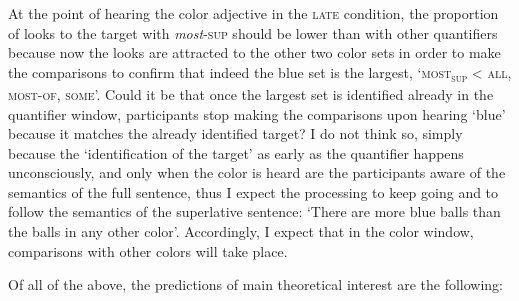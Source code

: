 \documentclass[output=paper]{langscibook}
\begin{document}
At the point of hearing the color adjective in the \textsc{late} condition, the proportion of looks to the target with
\textit{most}\textsc{-sup} should be lower than with other quantifiers because now the looks are attracted to the
other two color sets in order to make the comparisons to confirm that indeed the blue set is the largest,
`\textsc{most\textsubscript{sup}} {\textless} \textsc{all}, \textsc{most-of}, \textsc{some}'. Could it be that once the
largest set is identified already in the quantifier window, participants stop making the comparisons upon hearing `blue' because it matches the already identified target? I do not think so, simply because the `identification of the target' as early as the quantifier happens unconsciously, and only when the color is heard are the participants aware of the semantics of the full sentence, thus I expect the processing to keep going and to follow the semantics of the
superlative sentence: `There are more blue balls than the balls in any other color'. Accordingly, I expect that in the color window, comparisons with other colors will take place.

Of all of the above, the predictions of main theoretical interest are the following: 
\end{document}
